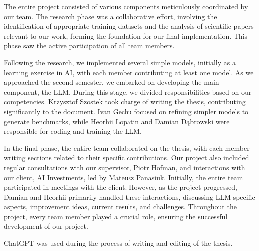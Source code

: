 The entire project consisted of various components meticulously coordinated by our team. The research phase was a collaborative effort, involving the identification of appropriate training datasets and the analysis of scientific papers relevant to our work, forming the foundation for our final implementation. This phase saw the active participation of all team members.

Following the research, we implemented several simple models, initially as a learning exercise in AI, with each member contributing at least one model. As we approached the second semester, we embarked on developing the main component, the LLM. During this stage, we divided responsibilities based on our competencies. Krzysztof Szostek took charge of writing the thesis, contributing significantly to the document. Ivan Gechu focused on refining simpler models to generate benchmarks, while Heorhii Lopatin and Damian Dąbrowski were responsible for coding and training the LLM.

In the final phase, the entire team collaborated on the thesis, with each member writing sections related to their specific contributions. Our project also included regular consultations with our supervisor, Piotr Hofman, and interactions with our client, AI Investments, led by Mateusz Panasiuk. Initially, the entire team participated in meetings with the client. However, as the project progressed, Damian and Heorhii primarily handled these interactions, discussing LLM-specific aspects, improvement ideas, current results, and challenges. Throughout the project, every team member played a crucial role, ensuring the successful development of our project.

ChatGPT was used during the process of writing and editing of the thesis.
